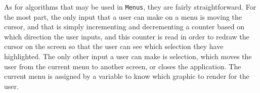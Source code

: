 \inputminted[baselinestretch=1]{python}{../code/LaserStrike.py}

As for algorithms that may be used in \texttt{Menus}, they
are fairly straightforward. For the most part, the only input that a
user can make on a menu is moving the cursor, and that is simply
incrementing and decrementing a counter based on which direction the
user inputs, and this counter is read in order to redraw the cursor on
the screen so that the user can see which selection they have highlighted.
The only other input a user can make is selection, which moves the user
from the current menu to another screen, or closes the application. The
current menu is assigned by a variable to know which graphic to render for
the user.
